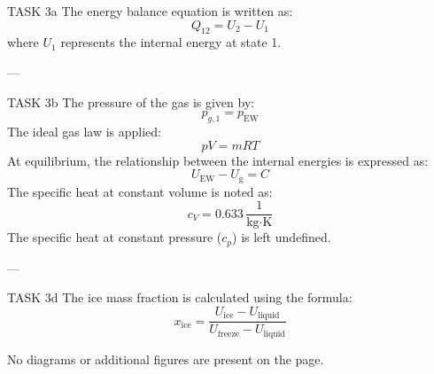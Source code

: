 TASK 3a  
The energy balance equation is written as:  
\[
Q_{12} = U_{2} - U_{1}
\]  
where \( U_1 \) represents the internal energy at state 1.

---

TASK 3b  
The pressure of the gas is given by:  
\[
p_{g,1} = p_{\text{EW}}
\]  
The ideal gas law is applied:  
\[
p V = m R T
\]  
At equilibrium, the relationship between the internal energies is expressed as:  
\[
U_{\text{EW}} - U_{\text{g}} = C
\]  
The specific heat at constant volume is noted as:  
\[
c_V = 0.633 \, \frac{1}{\text{kg·K}}
\]  
The specific heat at constant pressure (\( c_p \)) is left undefined.

---

TASK 3d  
The ice mass fraction is calculated using the formula:  
\[
x_{\text{ice}} = \frac{U_{\text{ice}} - U_{\text{liquid}}}{U_{\text{freeze}} - U_{\text{liquid}}}
\]  

No diagrams or additional figures are present on the page.